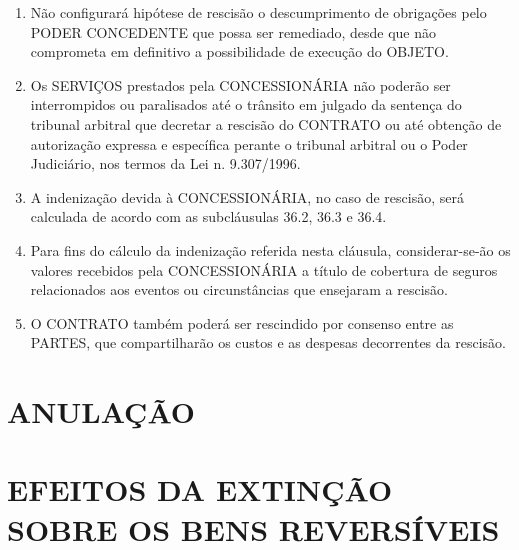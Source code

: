 \documentclass[a4paper,11pt]{report} %
\begin{document}
\begin{enumerate}
\item \label{itm:JLSY} Não configurará hipótese de rescisão o descumprimento de obrigações pelo PODER CONCEDENTE que possa ser remediado, desde que não comprometa em definitivo a possibilidade de execução do OBJETO.

\item \label{itm:KHR7} Os SERVIÇOS prestados pela CONCESSIONÁRIA não poderão ser interrompidos ou paralisados até o trânsito em julgado da sentença do tribunal arbitral que decretar a rescisão do CONTRATO ou até obtenção de autorização expressa e específica perante o tribunal arbitral ou o Poder Judiciário, nos termos da Lei n. 9.307/1996.

\item \label{itm:NY8T} A indenização devida à CONCESSIONÁRIA, no caso de rescisão, será calculada de acordo com as subcláusulas 36.2, 36.3 e 36.4.

\item \label{itm:82FJ} Para fins do cálculo da indenização referida nesta cláusula, considerar-se-ão os valores recebidos pela CONCESSIONÁRIA a título de cobertura de seguros relacionados aos eventos ou circunstâncias que ensejaram a rescisão.

\item \label{itm:95YC} O CONTRATO também poderá ser rescindido por consenso entre as PARTES, que compartilharão os custos e as despesas decorrentes da rescisão.
\end{enumerate}

\section{ANULAÇÃO}
\label{sec:P6WD}

\begin{enumerate}
\end{enumerate}

\section{EFEITOS DA EXTINÇÃO SOBRE OS BENS REVERSÍVEIS}
\label{sec:MYB9}
\end{document}
